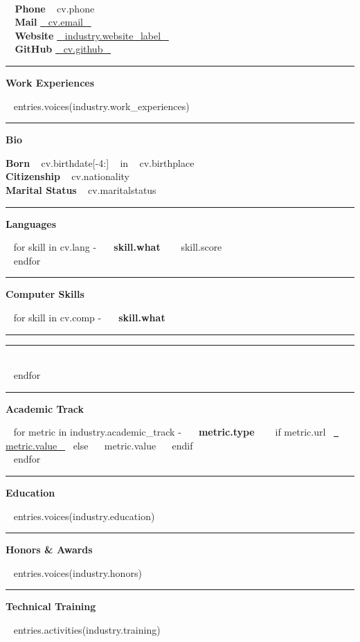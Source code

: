 \documentclass[a4paper]{article}
\newcommand{\crule}[3][black]{\textcolor{#1}{\rule{#2}{#3}}}
\newcommand{\progbar}[4][black]{\crule[#1]{#3}{#4}\crule[#1!10!white!90]{#2}{#4}}
\newcommand{\block}[1]{\hrule \vspace{0.2cm} \textbf{\Large #1} \vspace{0.2cm}}
\newcommand{\skill}[2]{\textbf{#1} \hfill #2 \\}
\newcommand{\skillbar}[4]{\textbf{#1} \hfill \progbar{#2}{#3}{#4} \\}
\begin{document}
\begin{minipage}[c]{0.6\columnwidth}
    \\
\end{minipage}
\hfill
\begin{minipage}[t]{0.375\columnwidth}
    \vspace{-1.5em}
    \skill{\faPhone~ Phone}{~{{ cv.phone }}~}
    \skill{\faEnvelope~ Mail}{\href{mailto:~{{ cv.email }}~}{~{{ cv.email }}~}}
    \skill{\faGlobe~ Website}{\href{~{{ cv.site }}~}{~{{ industry.website_label }}~}}
    \skill{\faGithub~ GitHub}{\href{https://github.com/~{{ cv.github }}~}{~{{ cv.github }}~}}
\end{minipage}
\vspace{-0.25em}

\begin{minipage}[t]{0.6\columnwidth}
    \block{Work Experiences}

~{{ entries.voices(industry.work_experiences) }}~
\end{minipage}
\hfill
\begin{minipage}[t]{0.375\columnwidth}
    \block{Bio}

    \skill{Born}{~{{ cv.birthdate[-4:] }}~ in ~{{ cv.birthplace }}~}
    \skill{Citizenship}{~{{ cv.nationality }}~}
    \skill{Marital Status}{~{{ cv.maritalstatus }}~}

    \block{Languages}

~{ for skill in cv.lang -}~
    \skill{~{{ skill.what }}~}{~{{ skill.score }}~}
~{ endfor }~

    \block{Computer Skills}

~{ for skill in cv.comp -}~
    \skillbar{~{{ skill.what }}~}
        {~{{ 2 - skill.score * 2 }}~cm}
        {~{{ skill.score * 2 }}~cm}
        {0.25cm}
~{ endfor }~

    \block{Academic Track}

~{ for metric in industry.academic_track -}~
    \skill{~{{ metric.type }}~}{~{ if metric.url }~\href{~{{ entries.url(metric.url) }}~}{~{{ metric.value }}~}~{ else }~~{{ metric.value }}~~{ endif }~}
~{ endfor }~
\end{minipage}

\bigskip
\block{Education}

~{{ entries.voices(industry.education) }}~

\clearpage
\block{Honors \& Awards}

~{{ entries.voices(industry.honors) }}~

\block{Technical Training}

~{{ entries.activities(industry.training) }}~
\end{document}
